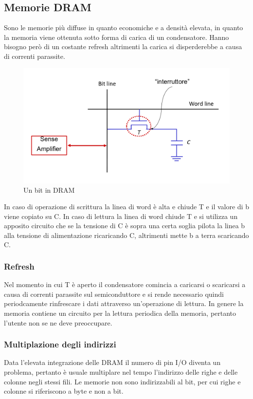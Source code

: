 \subsection{Memorie DRAM}
Sono le memorie pi\`u diffuse in quanto economiche e a densit\`a elevata, in quanto la memoria viene ottenuta sotto forma di carica di un condensatore. Hanno bisogno
per\`o di un costante refresh altrimenti la carica si disperderebbe a causa di correnti parassite.
\begin{figure}
  \includegraphics[scale=0.2]{Pictures/DRAM.png}
  \caption{Un bit in DRAM}
  \label{fig:boat1}
\end{figure}
In caso di operazione di scrittura la linea di word \`e alta e chiude T e il valore di b viene copiato su C. In caso di lettura la linea di word chiude T e si utilizza
un apposito circuito che se la tensione di C \`e sopra una certa soglia pilota la linea b alla tensione di alimentazione ricaricando C, altrimenti mette b a terra 
scaricando C.
\subsubsection{Refresh}
Nel momento in cui T \`e aperto il condensatore comincia a caricarsi o scaricarsi a causa di correnti parassite sul semiconduttore e si rende necessario quindi 
periodcamente rinfrescare i dati attraverso un'operazione di lettura. In genere la memoria contiene un circuito per la lettura periodica della memoria, pertanto 
l'utente non se ne deve preoccupare.
\subsubsection{Multiplazione degli indirizzi}
Data l'elevata integrazione delle DRAM il numero di pin I/O diventa un problema, pertanto \`e usuale multiplare nel tempo l'indirizzo delle righe e delle colonne negli
stessi fili. Le memorie non sono indirizzabili al bit, per cui righe e colonne si riferiscono a byte e non a bit. 
